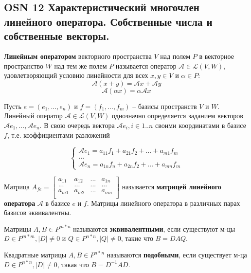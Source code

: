\subsection{OSN 12 Характеристический многочлен линейного оператора. Собственные числа и собственные векторы.}

\textbf{Линейным оператором} векторного пространства $V$ над полем $P$ в векторное пространство $W$ над тем же полем $P$ называется оператор $\mathcal{A} \in \mathcal{L}(V, W)$, удовлетворяющий условию линейности для всех $x, y \in V$ и $\alpha \in P$:
$$\mathcal{A} (x+y) = \mathcal{A} x + \mathcal{A} y$$
$$\mathcal{A} (\alpha x) = \alpha \mathcal{A} x$$

Пусть $e = (e_1, ..., e_n)$ и $f = (f_1, ..., f_m)$ -- базисы пространств $V$ и $W$. Линейный оператор $\mathcal{A} \in \mathcal{L}(V, W)$ однозначно определяется заданием векторов $\mathcal{A} e_1, ..., \mathcal{A} e_n$. В свою очередь вектора $\mathcal{A} e_i, i \in 1..n$ своими координатами в базисе $f$, т.е. коэффициентами разложений

$$\begin{cases} 
 \mathcal{A} e_1 = a_{11} f_1 + a_{21} f_2 + ... + a_{m1} f_m \\
 ... \\
 \mathcal{A} e_n = a_{1n} f_n + a_{2n} f_2 + ... + a_{mn} f_m
\end{cases}$$

Матрица $A_{fe} = 
\begin{bmatrix}
a_{11} & a_{12} & ... & a_{1n} \\
... & ... & ... & ... \\
a_{m1} & a_{m2} & ... & a_{mn} \\
\end{bmatrix}$
называется \textbf{матрицей линейного оператора} $\mathcal{A}$ в базисе $e$ и $f$. Матрицы линейного оператора в различных парах базисов эквивалентны.

Матрицы $A, B \in P^{m*n}$ называются \textbf{эквивалентными}, если существуют м-цы $D \in P^{m*m}, |D| \neq 0$ и $Q \in P^{n*n}, |Q| \neq 0$, такие что $B = D A Q$.

Квадратные матрицы $A, B \in P^{n*n}$ называются \textbf{подобными}, если существует м-ца $D \in P^{n*n}, |D| \neq 0$, такая что $B = D^{-1} A D$.



